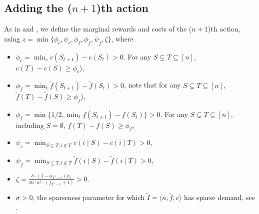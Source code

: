 \documentclass[11pt]{article}
\newcommand{\inst}[3]{\langle #1, #2, #3 \rangle}
\newcommand{\tf}{\tilde{f}}
\newcommand{\tI}{\tilde{I}}
\newcommand{\InstFTildeI}{\tI = \inst{n}{\tf}{c}}
\begin{document}
\subsection{Adding the ($n+1$)th action}
As in  and , we 
define the marginal rewards and costs of the ($n+1$)th action, 
using $z = \min \{\phi_{c},\psi_{c},\phi_{f},\phi_{\tf},\psi_{\tf}, \zeta\}$, where
\begin{itemize}
    \setlength\itemsep{-0.25em}
    \item $\phi_{c} = \min_{c} c(S_{t+1})-c(S_{t}) > 0$. For any $S \subsetneq T \subseteq [n]$, $c(T)-c(S) \ge \phi_{c}$),
    \item $\phi_{\tf} = \min_{t} \tf(S_{t+1})-\tf(S_{t}) > 0$, note that for any $S \subsetneq T \subseteq [n]$, $\tf(T)-\tf(S) \ge \phi_{\tf}$),
    \item $\phi_{f} = \min\{1/2,\min_{t} f(S_{t+1})-f(S_{t})\} > 0$. For any $S \subsetneq T \subseteq [n]$, including $S = \emptyset$, $f(T)-f(S) \ge \phi_{f}$,
    \item $\psi_{c} = \min_{S\subseteq T, i \notin T} c(i \mid S)-c(i \mid T) > 0$,
    \item $\psi_{\tf} = \min_{S\subseteq T, i \notin T} \tf(i \mid S)-\tf(i \mid T) > 0$,
    \item $\zeta = \frac{\delta \cdot (1-\alpha_{2^n-1})\phi_f}{16\cdot n^2 \cdot(f_{2^n-1}+1)}> 0$.
    \item $\sigma>0$, the sparseness parameter for which $\InstFTildeI$ has sparse demand, see .
\end{itemize}
\end{document}
